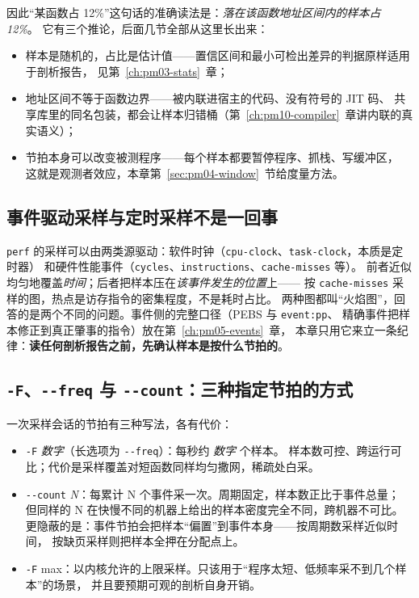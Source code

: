 \documentclass[12pt,a4paper,fontset=fandol]{ctexbook}
\newcommand{\Tp}[1]{\texttt{#1}}
\newcommand{\Opt}[1]{\texttt{-\/-#1}}
\begin{document}
因此``某函数占 12\%''这句话的准确读法是：\emph{落在该函数地址区间内的样本占 12\%}。
它有三个推论，后面几节全部从这里长出来：

\begin{itemize}
  \item 样本是随机的，占比是估计值——置信区间和最小可检出差异的判据原样适用于剖析报告，
        见第~\ref{ch:pm03-stats}~章；
  \item 地址区间不等于函数边界——被内联进宿主的代码、没有符号的 JIT 码、
        共享库里的同名包装，都会让样本归错桶（第~\ref{ch:pm10-compiler}~章讲内联的真实语义）；
  \item 节拍本身可以改变被测程序——每个样本都要暂停程序、抓栈、写缓冲区，
        这就是观测者效应，本章第~\ref{sec:pm04-window}~节给度量方法。
\end{itemize}

\subsection{事件驱动采样与定时采样不是一回事}

\Tp{perf} 的采样可以由两类源驱动：软件时钟（\Tp{cpu-clock}、\Tp{task-clock}，本质是定时器）
和硬件性能事件（\Tp{cycles}、\Tp{instructions}、\Tp{cache-misses} 等）。
前者近似均匀地覆盖\emph{时间}；后者把样本压在\emph{该事件发生的位置}上——
按 \Tp{cache-misses} 采样的图，热点是访存指令的密集程度，不是耗时占比。
两种图都叫``火焰图''，回答的是两个不同的问题。事件侧的完整口径（PEBS 与 \Tp{event:pp}、
精确事件把样本修正到真正肇事的指令）放在第~\ref{ch:pm05-events}~章，
本章只用它来立一条纪律：\textbf{读任何剖析报告之前，先确认样本是按什么节拍的}。

\subsection{\Tp{-F}、\Opt{freq} 与 \Opt{count}：三种指定节拍的方式}

一次采样会话的节拍有三种写法，各有代价：

\begin{itemize}
  \item \Tp{-F} \emph{数字}（长选项为 \Opt{freq}）：每秒约 \emph{数字} 个样本。
        样本数可控、跨运行可比；代价是采样覆盖对短函数同样均匀撒网，稀疏处白采。
  \item \Opt{count} \emph{N}：每累计 N 个事件采一次。周期固定，样本数正比于事件总量；
        但同样的 N 在快慢不同的机器上给出的样本密度完全不同，跨机器不可比。
        更隐蔽的是：事件节拍会把样本``偏置''到事件本身——按周期数采样近似时间，
        按缺页采样则把样本全押在分配点上。
  \item \Tp{-F} max：以内核允许的上限采样。只该用于``程序太短、低频率采不到几个样本''的场景，
        并且要预期可观的剖析自身开销。
\end{itemize}
\end{document}
